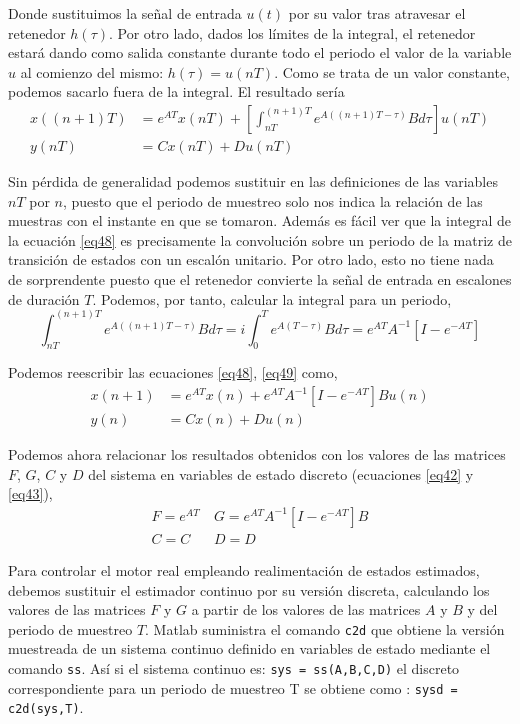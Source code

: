 \documentclass[10pt,a4paper]{report}
\begin{document}
Donde sustituimos la señal de entrada $u(t)$ por su valor tras atravesar el retenedor $h(\tau)$. Por otro lado, dados los límites de la integral, el retenedor estará dando como salida constante durante todo el periodo el valor de la variable $u$ al comienzo del mismo: $h(\tau) = u(nT)$. Como se trata de un valor constante, podemos sacarlo fuera de la integral. El resultado sería
\begin{align}
x((n+1)T) &= e^{AT}x(nT) + \left[\int_{nT}^{(n+1)T} e^{A((n+1)T-\tau)}Bd\tau\right] u(nT) \label{eq48}\\ 
y(nT) &= Cx(nT) + Du(nT) \label{eq49}
\end{align}

Sin pérdida de generalidad podemos sustituir en las definiciones de las variables $nT$ por $n$, puesto que el periodo de muestreo solo nos indica la relación de las muestras con el instante en que se tomaron. Además es fácil ver que la integral de la ecuación \ref{eq48} es precisamente la convolución sobre un periodo de la matriz de transición de estados con un escalón unitario. Por otro lado, esto no tiene nada de sorprendente puesto que el retenedor convierte la señal de entrada en escalones de duración $T$. Podemos, por tanto, calcular la integral para un periodo,
\begin{equation}
\int_{nT}^{(n+1)T} e^{A((n+1)T-\tau)}Bd\tau = i\int_0^Te^{A(T-\tau)}Bd\tau = e^{AT}A^{-1}\left[ I - e^{-AT}\right]
\end{equation}

Podemos reescribir las ecuaciones \ref{eq48}, \ref{eq49} como,
\begin{align}
x(n+1) &= e^{AT}x(n) + e^{AT}A^{-1}\left[ I - e^{-AT}\right]Bu(n) \label{eq411}\\
y(n) &= Cx(n) + Du(n) \label{eq411}
\end{align}

Podemos  ahora relacionar los resultados obtenidos con los valores de las matrices $F$, $G$, $C$ y $D$ del sistema en variables de estado discreto (ecuaciones \ref{eq42} y \ref{eq43}), 
\begin{align}
F = e^{AT} & \ G = e^{AT}A^{-1}\left[ I - e^{-AT}\right]B\\
C = C\ \ \  & \ D=D
\end{align}

Para controlar el motor real empleando realimentación de estados estimados, debemos sustituir el estimador continuo por su versión discreta, calculando los valores de las matrices $F$ y $G$ a partir de los valores de las matrices $A$ y $B$ y del periodo de muestreo $T$. Matlab suministra el comando \texttt{c2d} que obtiene la versión muestreada de un sistema continuo definido en variables de estado mediante el comando \texttt{ss}. Así si el sistema continuo es: \texttt{sys = ss(A,B,C,D)} el discreto correspondiente para un periodo de muestreo T se obtiene como : \texttt{sysd = c2d(sys,T)}. 
\end{document}
